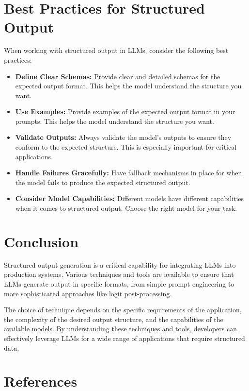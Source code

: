 \documentclass{article}
\begin{document}
\section{Best Practices for Structured Output}

When working with structured output in LLMs, consider the following best practices:

\begin{itemize}
    \item \textbf{Define Clear Schemas:} Provide clear and detailed schemas for the expected output format. This helps the model understand the structure you want.
    \item \textbf{Use Examples:} Provide examples of the expected output format in your prompts. This helps the model understand the structure you want.
    \item \textbf{Validate Outputs:} Always validate the model's outputs to ensure they conform to the expected structure. This is especially important for critical applications.
    \item \textbf{Handle Failures Gracefully:} Have fallback mechanisms in place for when the model fails to produce the expected structured output.
    \item \textbf{Consider Model Capabilities:} Different models have different capabilities when it comes to structured output. Choose the right model for your task.
\end{itemize}

\section{Conclusion}

Structured output generation is a critical capability for integrating LLMs into production systems. Various techniques and tools are available to ensure that LLMs generate output in specific formats, from simple prompt engineering to more sophisticated approaches like logit post-processing.

The choice of technique depends on the specific requirements of the application, the complexity of the desired output structure, and the capabilities of the available models. By understanding these techniques and tools, developers can effectively leverage LLMs for a wide range of applications that require structured data.

\section{References}
\end{document}
